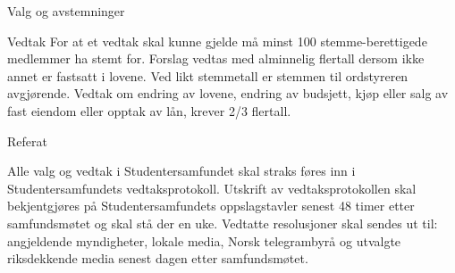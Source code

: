 \documentclass[fsbok.tex]{subfiles}
\begin{document}
\begin{lovkapittel}{Valg og avstemninger}
\begin{lovparagraf}{Vedtak}
For at et vedtak skal kunne gjelde må minst 100 stemme-berettigede medlemmer ha stemt for. Forslag vedtas med
alminnelig flertall dersom ikke annet er fastsatt i lovene. Ved likt stemmetall er stemmen til ordstyreren avgjørende.
Vedtak om endring av lovene, endring av budsjett, kjøp eller salg av fast eiendom eller opptak av lån, krever 2/3
flertall.
  
  \end{lovparagraf}
  
  \begin{lovparagraf}{Referat}

Alle valg og vedtak i Studentersamfundet skal straks føres inn i Studentersamfundets vedtaksprotokoll. Utskrift av
vedtaksprotokollen skal bekjentgjøres på Studentersamfundets oppslagstavler senest 48 timer etter samfundsmøtet og
skal stå der en uke. Vedtatte resolusjoner skal sendes ut til: angjeldende myndigheter, lokale media, Norsk
telegrambyrå og utvalgte riksdekkende media senest dagen etter samfundsmøtet.
  
  \end{lovparagraf}
    
\end{lovkapittel}
\end{document}
